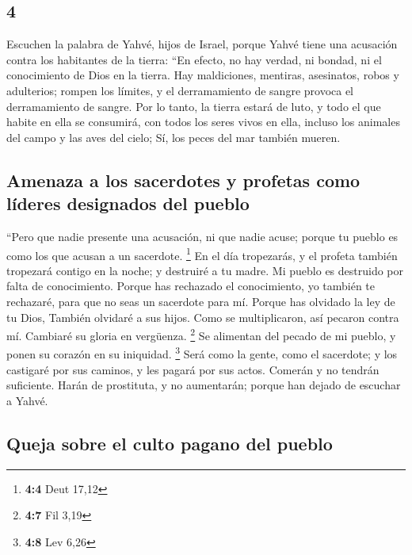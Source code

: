 \begin{paracol}{2}
\hypertarget{section-6}{%
\section{4}\label{section-6}}

 Escuchen la palabra de Yahvé, hijos de Israel, porque
Yahvé tiene una acusación contra los habitantes de la tierra: ``En
efecto, no hay verdad, ni bondad, ni el conocimiento de Dios en la
tierra.  Hay maldiciones, mentiras, asesinatos, robos y
adulterios; rompen los límites, y el derramamiento de sangre provoca el
derramamiento de sangre.  Por lo tanto, la tierra estará
de luto, y todo el que habite en ella se consumirá, con todos los seres
vivos en ella, incluso los animales del campo y las aves del cielo; Sí,
los peces del mar también mueren.

\hypertarget{amenaza-a-los-sacerdotes-y-profetas-como-luxedderes-designados-del-pueblo}{%
\subsection{Amenaza a los sacerdotes y profetas como líderes designados
del
pueblo}\label{amenaza-a-los-sacerdotes-y-profetas-como-luxedderes-designados-del-pueblo}}

 ``Pero que nadie presente una acusación, ni que nadie
acuse; porque tu pueblo es como los que acusan a un sacerdote.
\footnote{\textbf{4:4} Deut 17,12}  En el día tropezarás,
y el profeta también tropezará contigo en la noche; y destruiré a tu
madre.  Mi pueblo es destruido por falta de conocimiento.
Porque has rechazado el conocimiento, yo también te rechazaré, para que
no seas un sacerdote para mí. Porque has olvidado la ley de tu Dios,
También olvidaré a sus hijos.  Como se multiplicaron, así
pecaron contra mí. Cambiaré su gloria en vergüenza. \footnote{\textbf{4:7}
  Fil 3,19}  Se alimentan del pecado de mi pueblo, y ponen
su corazón en su iniquidad. \footnote{\textbf{4:8} Lev 6,26}
 Será como la gente, como el sacerdote; y los castigaré
por sus caminos, y les pagará por sus actos.  Comerán y
no tendrán suficiente. Harán de prostituta, y no aumentarán; porque han
dejado de escuchar a Yahvé.

\hypertarget{queja-sobre-el-culto-pagano-del-pueblo}{%
\subsection{Queja sobre el culto pagano del
pueblo}\label{queja-sobre-el-culto-pagano-del-pueblo}}


\end{paracol}
